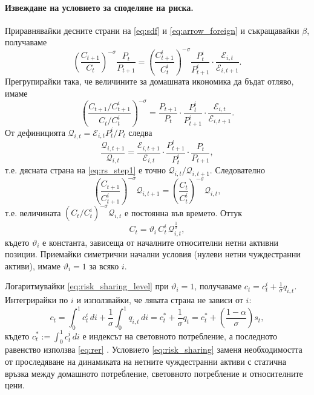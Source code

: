\paragraph{Извеждане на условието за споделяне на риска.}
Приравнявайки десните страни на \eqref{eq:sdf} и \eqref{eq:arrow_foreign} и съкращавайки $\beta$, получаваме
\[
\left( \frac{C_{t+1}}{C_t} \right)^{-\sigma} \frac{P_t}{P_{t+1}}
= \left( \frac{C^i_{t+1}}{C^i_t} \right)^{-\sigma} \frac{P^i_t}{P^i_{t+1}} \cdot \frac{\mathcal{E}_{i,t}}{\mathcal{E}_{i,t+1}}.
\]
Прегрупирайки така, че величините за домашната икономика да бъдат отляво, имаме
\begin{equation}
\left( \frac{C_{t+1}/C^i_{t+1}}{C_t/C^i_t} \right)^{-\sigma}
= \frac{P_{t+1}}{P_t} \cdot \frac{P^i_t}{P^i_{t+1}} \cdot \frac{\mathcal{E}_{i,t}}{\mathcal{E}_{i,t+1}}.
\label{eq:rs_step1}
\end{equation}
От дефиницията $\mathcal{Q}_{i,t} = \mathcal{E}_{i,t}P^i_t/P_t$ следва
\[
\frac{\mathcal{Q}_{i,t+1}}{\mathcal{Q}_{i,t}}
= \frac{\mathcal{E}_{i,t+1}}{\mathcal{E}_{i,t}} \cdot \frac{P^i_{t+1}}{P^i_t} \cdot \frac{P_t}{P_{t+1}},
\]
т.е. дясната страна на \eqref{eq:rs_step1} е точно $\mathcal{Q}_{i,t}/\mathcal{Q}_{i,t+1}$. Следователно
\begin{equation}
\left( \frac{C_{t+1}}{C^i_{t+1}} \right)^{-\sigma} \mathcal{Q}_{i,t+1}
= \left( \frac{C_t}{C^i_t} \right)^{-\sigma} \mathcal{Q}_{i,t},
\label{eq:rs_step2}
\end{equation}
т.е. величината $(C_t/C^i_t)^{-\sigma}\mathcal{Q}_{i,t}$ е постоянна във времето. Оттук
\begin{equation}
C_t = \vartheta_i\, C^i_t\, \mathcal{Q}_{i,t}^{\frac{1}{\sigma}},
\label{eq:risk_sharing_level}
\end{equation}
където $\vartheta_i$ е константа, зависеща от началните относителни нетни активни позиции. Приемайки симетрични начални условия (нулеви нетни чуждестранни активи), имаме $\vartheta_i = 1$ за всяко $i$.

Логаритмувайки \eqref{eq:risk_sharing_level} при $\vartheta_i = 1$, получаваме $c_t = c^i_t + \frac{1}{\sigma} q_{i,t}$. Интегрирайки по $i$ и използвайки, че лявата страна не зависи от $i$:
\begin{equation}
c_t = \int_0^1 c^i_t\, di + \frac{1}{\sigma} \int_0^1 q_{i,t}\, di
= c^*_t + \frac{1}{\sigma} q_t
= c^*_t + \left( \frac{1-\alpha}{\sigma} \right) s_t,
\label{eq:risk_sharing}
\end{equation}
където $c^*_t := \int_0^1 c^i_t\, di$ е индексът на световното потребление, а последното равенство използва \eqref{eq:rer} \parencite[с.~157]{Gali2008}. Условието \eqref{eq:risk_sharing} заменя необходимостта от проследяване на динамиката на нетните чуждестранни активи с статична връзка между домашното потребление, световното потребление и относителните цени.

